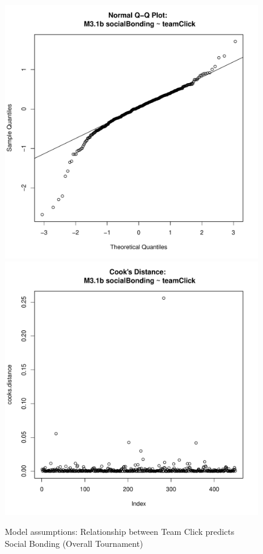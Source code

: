 {\begin{figure}[htbp]
              \includegraphics[scale =.4]{images/MLM31bQQNorm.pdf}
              \includegraphics[scale =.4]{images/MLM31bCooksD.pdf}
              \caption{Model assumptions: Relationship between Team Click predicts Social Bonding (Overall Tournament)}
              \label{fig:MLM31bAssumptions}
            \end{figure}


}
